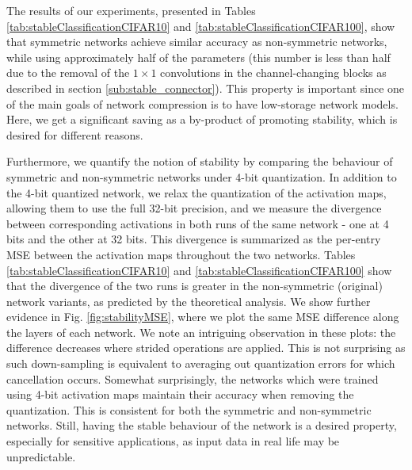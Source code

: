 \documentclass[reqno]{amsart}
\begin{document}
The results of our experiments, presented in Tables  \ref{tab:stableClassificationCIFAR10} and \ref{tab:stableClassificationCIFAR100}, show that symmetric networks achieve similar accuracy as non-symmetric networks, while using approximately half of the parameters (this number is less than half due to the removal of the $1\times1$ convolutions in the channel-changing blocks as described in section \ref{sub:stable_connector}). This property is important since one of the main goals of network compression is to have low-storage network models. Here, we get a significant saving as a by-product of promoting stability, which is desired for different reasons.

Furthermore, we quantify the notion of stability by comparing the behaviour of symmetric and non-symmetric networks under 4-bit quantization. In addition to the 4-bit quantized network, we relax the quantization of the activation maps, allowing them to use the full 32-bit precision, and we measure the divergence between corresponding activations in both runs of the same network - one at 4 bits and the other at 32 bits. This divergence is summarized as the per-entry MSE between the activation maps throughout the two networks. Tables \ref{tab:stableClassificationCIFAR10} and \ref{tab:stableClassificationCIFAR100} show that the divergence of the two runs is greater in the non-symmetric (original) network variants, as predicted by the theoretical analysis.  We show further evidence in Fig. \ref{fig:stabilityMSE}, where we plot the same MSE difference along the layers of each network. We note an intriguing observation in these plots:  the difference decreases where strided operations are applied. This is not surprising as such down-sampling is equivalent to averaging out quantization errors for which cancellation occurs. Somewhat surprisingly, the networks which were trained using 4-bit activation maps maintain their accuracy when removing the quantization. This is consistent for both the symmetric and non-symmetric networks. Still, having the stable behaviour of the network is a desired property, especially for sensitive applications, as input data in real life may be unpredictable.
\end{document}
